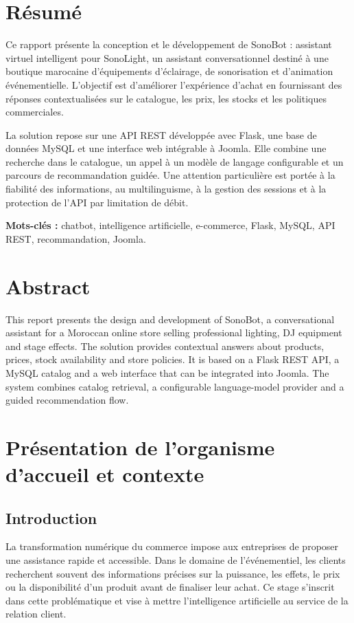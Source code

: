 \documentclass[12pt,a4paper,oneside]{report}
\newcommand{\project}{SonoBot : assistant virtuel intelligent pour SonoLight}
\begin{document}
\chapter*{Résumé}
Ce rapport présente la conception et le développement de \project, un assistant conversationnel destiné à une boutique marocaine d'équipements d'éclairage, de sonorisation et d'animation événementielle. L'objectif est d'améliorer l'expérience d'achat en fournissant des réponses contextualisées sur le catalogue, les prix, les stocks et les politiques commerciales.

La solution repose sur une API REST développée avec Flask, une base de données MySQL et une interface web intégrable à Joomla. Elle combine une recherche dans le catalogue, un appel à un modèle de langage configurable et un parcours de recommandation guidée. Une attention particulière est portée à la fiabilité des informations, au multilinguisme, à la gestion des sessions et à la protection de l'API par limitation de débit.

\textbf{Mots-clés :} chatbot, intelligence artificielle, e-commerce, Flask, MySQL, API REST, recommandation, Joomla.

\chapter*{Abstract}
This report presents the design and development of SonoBot, a conversational assistant for a Moroccan online store selling professional lighting, DJ equipment and stage effects. The solution provides contextual answers about products, prices, stock availability and store policies. It is based on a Flask REST API, a MySQL catalog and a web interface that can be integrated into Joomla. The system combines catalog retrieval, a configurable language-model provider and a guided recommendation flow.

\tableofcontents
\listoffigures
\listoftables
\clearpage
{}

\chapter{Présentation de l'organisme d'accueil et contexte}
\section{Introduction}
La transformation numérique du commerce impose aux entreprises de proposer une assistance rapide et accessible. Dans le domaine de l'événementiel, les clients recherchent souvent des informations précises sur la puissance, les effets, le prix ou la disponibilité d'un produit avant de finaliser leur achat. Ce stage s'inscrit dans cette problématique et vise à mettre l'intelligence artificielle au service de la relation client.
\end{document}
